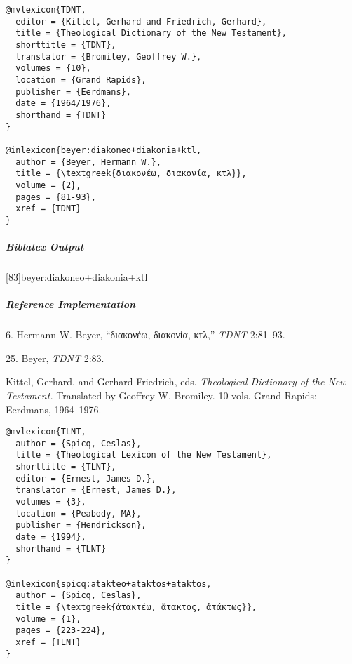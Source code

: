\documentclass[a4paper]{article}
\newcommand{\textgreek}[1]{{\greekfont #1}}
\newenvironment{biboutput}{%
  \subparagraph{Biblatex Output}
}{\color{black}}
\newenvironment{refimp}{%
  \subparagraph{Reference Implementation}
  \color{reference-colour}
  \rm
}{\par\color{black}}
\begin{document}
\medskip

\begin{lstlisting}
@mvlexicon{TDNT,
  editor = {Kittel, Gerhard and Friedrich, Gerhard},
  title = {Theological Dictionary of the New Testament},
  shorttitle = {TDNT},
  translator = {Bromiley, Geoffrey W.},
  volumes = {10},
  location = {Grand Rapids},
  publisher = {Eerdmans},
  date = {1964/1976},
  shorthand = {TDNT}
}

@inlexicon{beyer:diakoneo+diakonia+ktl,
  author = {Beyer, Hermann W.},
  title = {\textgreek{διακονέω, διακονία, κτλ}},
  volume = {2},
  pages = {81-93},
  xref = {TDNT}
}
\end{lstlisting}
  
\begin{biboutput}
  [83]{beyer:diakoneo+diakonia+ktl}
\end{biboutput}

\begin{refimp}
  \hspace*{\bibindent}6. Hermann W. Beyer, “\textgreek{διακονέω, διακονία, κτλ},”
  \emph{TDNT} 2:81–93.

  \hspace*{\bibindent}25. Beyer, \emph{TDNT} 2:83.

  \hangindent\bibindent Kittel, Gerhard, and Gerhard Friedrich, eds.
  \emph{Theological Dictionary of the New Testament.} Translated by Geoffrey
  W. Bromiley. 10 vols. Grand Rapids: Eerdmans, 1964–1976.

\end{refimp}

\medskip

\begin{lstlisting}
@mvlexicon{TLNT,
  author = {Spicq, Ceslas},
  title = {Theological Lexicon of the New Testament},
  shorttitle = {TLNT},
  editor = {Ernest, James D.},
  translator = {Ernest, James D.},
  volumes = {3},
  location = {Peabody, MA},
  publisher = {Hendrickson},
  date = {1994},
  shorthand = {TLNT}
}

@inlexicon{spicq:atakteo+ataktos+ataktos,
  author = {Spicq, Ceslas},
  title = {\textgreek{ἀτακτέω, ἄτακτος, ἀτάκτως}},
  volume = {1},
  pages = {223-224},
  xref = {TLNT}
}
\end{lstlisting}
\end{document}
